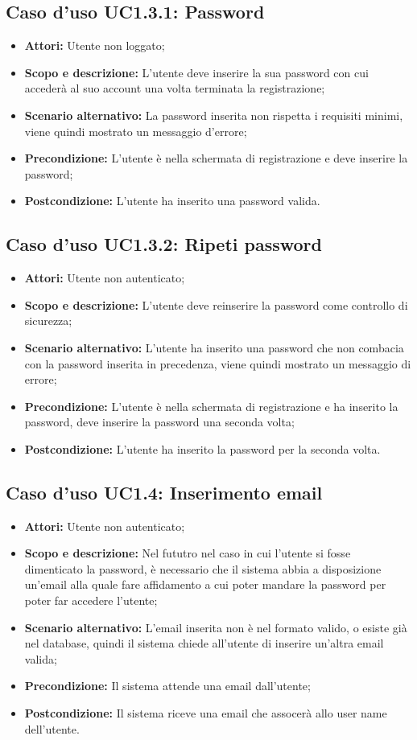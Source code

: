 \documentclass[12pt,a4paper,titlepage]{article}
\begin{document}
\subsection{Caso d'uso UC1.3.1: Password}
\begin{itemize}
	\item \textbf{Attori: }Utente non loggato;
	\item \textbf{Scopo e descrizione: }L'utente deve inserire la sua password con cui accederà al suo account una volta terminata la registrazione;
	\item \textbf{Scenario alternativo: }La password inserita non rispetta i requisiti minimi, viene quindi mostrato un messaggio d'errore;
	\item \textbf{Precondizione: }L'utente è nella schermata di registrazione e deve inserire la password;
	\item \textbf{Postcondizione: }L'utente ha inserito una password valida.
\end{itemize}
\subsection{Caso d'uso UC1.3.2: Ripeti password}
\begin{itemize}
	\item \textbf{Attori: }Utente non autenticato;
	\item \textbf{Scopo e descrizione: }L'utente deve reinserire la password come controllo di sicurezza;
	\item \textbf{Scenario alternativo: }L'utente ha inserito una password che non combacia con la password inserita in precedenza, viene quindi mostrato un messaggio di errore;
	\item \textbf{Precondizione: }L'utente è nella schermata di registrazione e ha inserito la password, deve inserire la password una seconda volta;
	\item \textbf{Postcondizione: }L'utente ha inserito la password per la seconda volta.
\end{itemize}
\subsection{Caso d'uso UC1.4: Inserimento email}
\begin{itemize}
	\item \textbf{Attori: }Utente non autenticato;
	\item \textbf{Scopo e descrizione: }Nel fututro nel caso in cui l'utente si fosse dimenticato la password, è necessario che il sistema abbia a disposizione un'email alla quale fare affidamento a cui poter mandare la password per poter far accedere l'utente;
	\item \textbf{Scenario alternativo: }L'email inserita non è nel formato valido, o esiste già nel database, quindi il sistema chiede all'utente di inserire un'altra email valida;
	\item \textbf{Precondizione: }Il sistema attende una email dall'utente;
	\item \textbf{Postcondizione: }Il sistema riceve una email che assocerà allo user name dell'utente.
\end{itemize}
\end{document}
